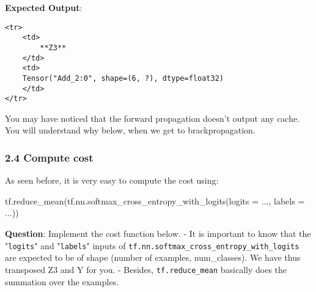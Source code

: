 \documentclass[11pt]{article}
\newenvironment{Shaded}{}{}
\newcommand{\NormalTok}[1]{{#1}}
\newcommand{\OperatorTok}[1]{\textcolor[rgb]{0.40,0.40,0.40}{{#1}}}
\begin{document}
    \textbf{Expected Output}:

\begin{verbatim}
<tr> 
    <td>
        **Z3**
    </td>
    <td>
    Tensor("Add_2:0", shape=(6, ?), dtype=float32)
    </td>
</tr>
\end{verbatim}

    You may have noticed that the forward propagation doesn't output any
cache. You will understand why below, when we get to brackpropagation.

    \subsubsection{2.4 Compute cost}\label{compute-cost}

As seen before, it is very easy to compute the cost using:

\begin{Shaded}
\begin{Highlighting}[]
\NormalTok{tf.reduce_mean(tf.nn.softmax_cross_entropy_with_logits(logits }\OperatorTok{=}\NormalTok{ ..., labels }\OperatorTok{=}\NormalTok{ ...))}
\end{Highlighting}
\end{Shaded}

\textbf{Question}: Implement the cost function below. - It is important
to know that the "\texttt{logits}" and "\texttt{labels}" inputs of
\texttt{tf.nn.softmax\_cross\_entropy\_with\_logits} are expected to be
of shape (number of examples, num\_classes). We have thus transposed Z3
and Y for you. - Besides, \texttt{tf.reduce\_mean} basically does the
summation over the examples.
\end{document}
